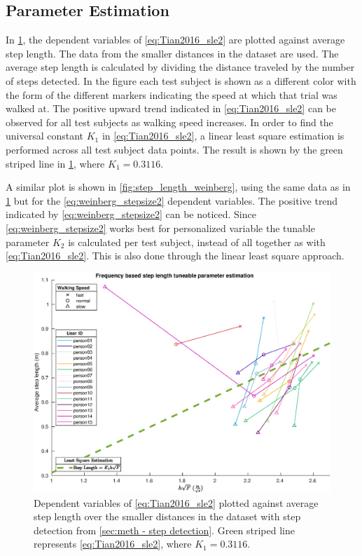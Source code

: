 \subsection{Parameter Estimation}
\label{sec:results-step_length-parameter_estimation}
In \cref{fig:step_length_tian}, the dependent variables of \eqref{eq:Tian2016_sle2} are plotted against average step length. The data from the smaller distances in the \citet{Vezocnik2019} dataset are used. The average step length is calculated by dividing the distance traveled by the number of steps detected. In the figure each test subject is shown as a different color with the form of the different markers indicating the speed at which that trial was walked at. The positive upward trend indicated in \eqref{eq:Tian2016_sle2} can be observed for all test subjects as walking speed increases. In order to find the universal constant $K_1$ in \eqref{eq:Tian2016_sle2}, a linear least square estimation is performed across all test subject data points. The result is shown by the green striped line in \cref{fig:step_length_tian}, where $ K_1 = 0.3116$. \par 

A similar plot is shown in \cref{fig:step_length_weinberg}, using the same data as in \cref{fig:step_length_tian} but for the \eqref{eq:weinberg_stepsize2} dependent variables. The positive trend indicated by \eqref{eq:weinberg_stepsize2} can be noticed. Since \eqref{eq:weinberg_stepsize2} works best for personalized variable the tunable parameter $ K_2 $ is calculated per test subject, instead of all together as with \eqref{eq:Tian2016_sle2}. This is also done through the linear least square approach.

	\begin{figure}[H]
	\centering
	\includegraphics[width=0.8\linewidth]{images/20201128_1304_}
	\setlength{\belowcaptionskip}{-10pt}
	\caption{Dependent variables of \eqref{eq:Tian2016_sle2} plotted against average step length over the smaller distances in the \citet{Vezocnik2019} dataset with step detection from \cref{sec:meth - step detection}. Green striped line represents \eqref{eq:Tian2016_sle2}, where $ K_1 = 0.3116$.  }
	\label{fig:step_length_tian}
	\end{figure}


